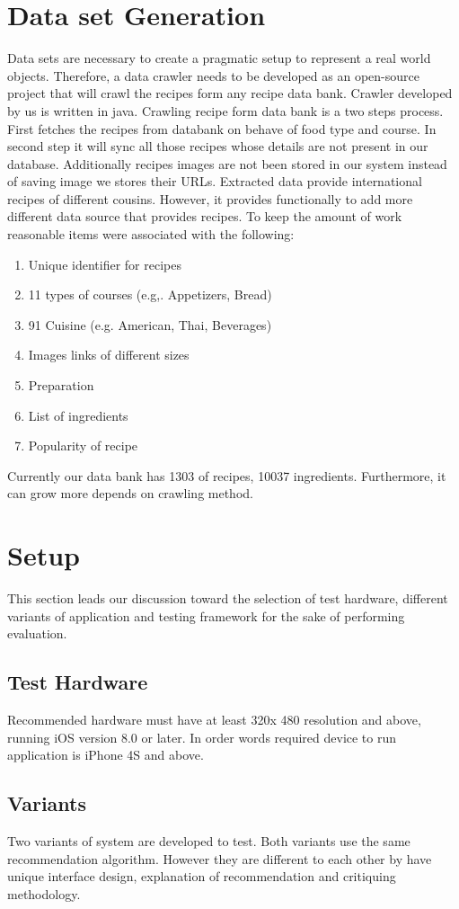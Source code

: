 \section{Data set Generation}
Data sets are necessary to create a pragmatic setup to represent a real world objects. Therefore, a data crawler needs to be developed as an open-source project that will crawl the recipes form any recipe data bank. Crawler developed by us is written in java.  Crawling recipe form data bank is a two steps process.  First fetches the recipes from databank on behave of food type and course.  In second step it will sync all those recipes whose details are not present in our database. Additionally recipes images are not been stored in our system instead of saving image we stores their URLs. Extracted data provide international recipes of different cousins. However, it provides functionally to add more different data source that provides recipes. To keep the amount of work reasonable items were associated with the following:
\begin{enumerate}
	\item Unique identifier for recipes
	\item 11 types of courses (e.g,. Appetizers, Bread)
	\item 91 Cuisine (e.g. American, Thai, Beverages)
	\item Images links of different sizes
	\item Preparation
	\item List of ingredients
	\item Popularity of recipe
\end{enumerate}
Currently our data bank has 1303 of recipes, 10037 ingredients. Furthermore, it can grow more depends on crawling method.
\section{Setup}
This section leads our discussion toward the selection of test hardware, different variants of application and testing framework for the sake of performing evaluation.
\subsection{Test Hardware}
Recommended hardware must have at least 320x 480 resolution and above, running iOS version 8.0 or later. In order words required device to run application is iPhone 4S and above.  
\subsection{Variants}
Two variants of system are developed to test. Both variants use the same recommendation algorithm. However they are different to each other by have unique interface design, explanation of recommendation and critiquing methodology.
